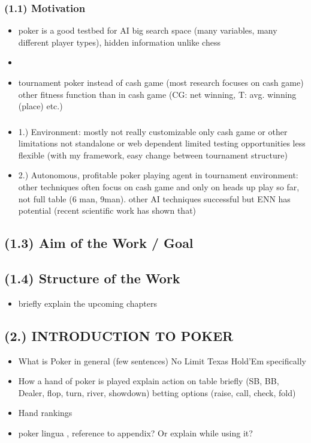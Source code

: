 \subsubsection{(1.1) Motivation}
\begin{itemize}
\item poker is a good testbed for AI
\subitem big search space (many variables, many different player types), hidden information unlike chess
\item {}
\item tournament poker instead of cash game (most research focuses on cash game)
\subitem other fitness function than in cash game (CG: net winning, T: avg. winning (place) etc.)
\end{itemize}
\subsubsection{}
\begin{itemize}
\item 1.) Environment: 
\subitem mostly not really customizable
\subitem only cash game or other limitations
\subitem not standalone or web dependent
\subitem limited testing opportunities
\subitem less flexible (with my framework, easy change between tournament structure)
\item 2.) Autonomous, profitable poker playing agent in tournament environment:
\subitem  other techniques often focus on cash game and only on heads up play so far, not full table (6 man, 9man).
\subitem other AI techniques successful but ENN has potential (recent scientific work has shown that)
\end{itemize}
\subsection{(1.3) Aim of the Work / Goal}
\subsection{(1.4) Structure of the Work}
\begin{itemize}
\item briefly explain the upcoming chapters
\end{itemize}
\subsection{(2.) INTRODUCTION TO POKER }
\begin{itemize}
\item What is Poker in general (few sentences)
\subitem No Limit Texas Hold'Em specifically
\item How a hand of poker is played
\subitem explain action on table briefly (SB, BB, Dealer, flop, turn, river, showdown)
\subitem betting options (raise, call, check, fold)
\item Hand rankings
\item poker lingua , reference to appendix? Or explain while using it?
\end{itemize}
